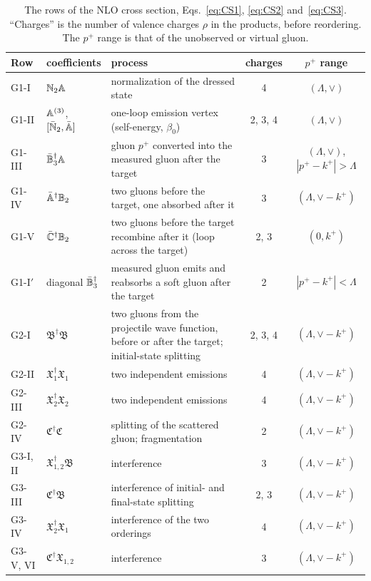 \begin{table}[!tbp]
\centering
\renewcommand{\arraystretch}{1.25}
\begin{tabular}{llL{5.7cm}cc}
\toprule
Row & coefficients & process & charges & $p^+$ range\\
\midrule
G1-I & $\mathbb{N}_2\mathbb{A}$ & normalization of the dressed state & 4 & $(\Lambda,\vee)$\\
G1-II & $\mathbb{A}^{(3)}$, $[\bar{\mathbb{N}}_2,\bar{\mathbb{A}}]$ & one-loop emission vertex (self-energy, $\beta_0$) & 2, 3, 4 & $(\Lambda,\vee)$\\
G1-III & $\bar{\mathbb{B}}_3^\dagger\mathbb{A}$ & gluon $p^+$ converted into the measured gluon after the target & 3 & $(\Lambda,\vee)$, $|p^+-k^+|>\Lambda$\\
G1-IV & $\bar{\mathbb{A}}^\dagger\mathbb{B}_2$ & two gluons before the target, one absorbed after it & 3 & $(\Lambda,\vee-k^+)$\\
G1-V & $\bar{\mathbb{C}}^\dagger\mathbb{B}_2$ & two gluons before the target recombine after it (loop across the target) & 2, 3 & $(0,k^+)$\\
G1-I$'$ & diagonal $\bar{\mathbb{B}}_3^\dagger$ & measured gluon emits and reabsorbs a soft gluon after the target & 2 & $|p^+-k^+|<\Lambda$\\
\midrule
G2-I & $\mathfrak B^\dagger\mathfrak B$ & two gluons from the projectile wave function, before or after the target; initial-state splitting & 2, 3, 4 & $(\Lambda,\vee-k^+)$\\
G2-II & $\mathfrak X_1^\dagger\mathfrak X_1$ & two independent emissions & 4 & $(\Lambda,\vee-k^+)$\\
G2-III & $\mathfrak X_2^\dagger\mathfrak X_2$ & two independent emissions & 4 & $(\Lambda,\vee-k^+)$\\
G2-IV & $\mathfrak C^\dagger\mathfrak C$ & splitting of the scattered gluon; fragmentation & 2 & $(\Lambda,\vee-k^+)$\\
\midrule
G3-I, II & $\mathfrak X_{1,2}^\dagger\mathfrak B$ & interference & 3 & $(\Lambda,\vee-k^+)$\\
G3-III & $\mathfrak C^\dagger\mathfrak B$ & interference of initial- and final-state splitting & 2, 3 & $(\Lambda,\vee-k^+)$\\
G3-IV & $\mathfrak X_2^\dagger\mathfrak X_1$ & interference of the two orderings & 4 & $(\Lambda,\vee-k^+)$\\
G3-V, VI & $\mathfrak C^\dagger\mathfrak X_{1,2}$ & interference & 3 & $(\Lambda,\vee-k^+)$\\
\bottomrule
\end{tabular}
\caption{The rows of the NLO cross section, Eqs.~\eqref{eq:CS1}, \eqref{eq:CS2} and~\eqref{eq:CS3}. ``Charges'' is the number of valence charges $\rho$ in the products, before reordering. The $p^+$ range is that of the unobserved or virtual gluon.}
\label{tab:rows}
\end{table}
